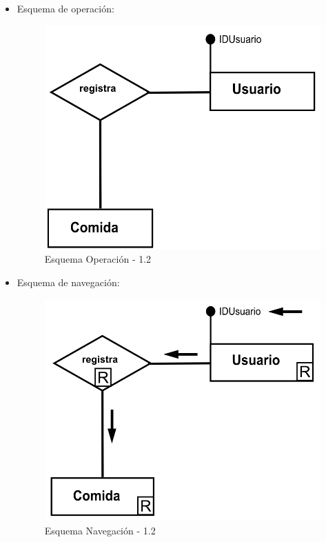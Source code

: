 \documentclass[a4paper,12pt]{report}
\begin{document}
\begin{enumerate}
\begin{itemize}
\item Esquema de operación:
\begin{figure}[!htp]
\centering
\includegraphics[width=0.6\linewidth]{./operaciones/img/Estadisticas/12_ope.png}
\caption{Esquema Operación - 1.2}
\label{fig:ope12}
\medskip
\footnotesize
{}
\end{figure}
\item Esquema de navegación:
\begin{figure}[!htp]
\centering
\includegraphics[width=0.6\linewidth]{./operaciones/img/Estadisticas/12_nav.png}
\caption{Esquema Navegación - 1.2}
\label{fig:nave12}
\medskip
\footnotesize
{}
\end{figure}
\end{itemize}


\end{enumerate}
\end{document}
